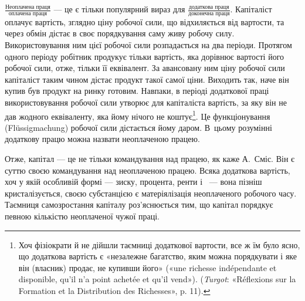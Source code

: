 \parcont{}  %
$\frac{\text{Неоплачена праця}}{\text{оплачена праця}}$ — це є тільки популярний вираз для
$\frac{\text{додаткова праця}}{\text{доконечна праця}}$. Капіталіст оплачує вартість, зглядно ціну
робочої сили, що відхиляється від вартости, та через обмін дістає в своє порядкування саму живу
робочу силу. Використовування ним цієї робочої сили розпадається на два періоди. Протягом одного
періоду робітник продукує тільки вартість,
яка дорівнює вартості його робочої сили, отже, тільки її еквівалент.
За авансовану ним ціну робочої сили капіталіст таким
чином дістає продукт такої самої ціни. Виходить так, наче він
купив був продукт на ринку готовим. Навпаки, в періоді додаткової
праці використовування робочої сили утворює для капіталіста
вартість, за яку він не дав жодного еквіваленту, яка
йому нічого не коштує\footnote{
Хоч фізіократи й не дійшли таємниці додаткової вартости, все ж
їм було ясно, що додаткова вартість є «незалежне багатство, яким можна
порядкувати і яке він (власник) продає, не купивши його» («une richesse
indépendante et disponible, qu’il n’a point achetée et qu'il vend»). (\emph{Turgot}:
«Réflexions sur la Formation et la Distribution des Richesses», p. 11).
}. Це функціонування (Flüssigmachung)
робочої сили дістається йому даром. В~цьому розумінні додаткову
працю можна назвати неоплаченою працею.

Отже, капітал — це не тільки командування над працею,
як каже А.~Сміс. Він є суттю своєю командування над неоплаченою
працею. Всяка додаткова вартість, хоч у якій особливій
формі — зиску, процента, ренти і~ — вона пізніш кристалізується,
своєю субстанцією є матеріялізація неоплаченого робочого
часу. Таємниця самозростання капіталу роз’яснюється тим,
що капітал порядкує певною кількістю неоплаченої чужої праці.
